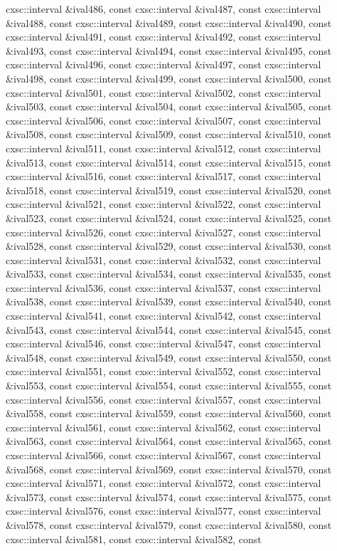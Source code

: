 \begin{DoxyCompactItemize}
cxsc\-::interval \&ival486, const cxsc\-::interval \&ival487, const cxsc\-::interval \&ival488, const cxsc\-::interval \&ival489, const cxsc\-::interval \&ival490, const cxsc\-::interval \&ival491, const cxsc\-::interval \&ival492, const cxsc\-::interval \&ival493, const cxsc\-::interval \&ival494, const cxsc\-::interval \&ival495, const cxsc\-::interval \&ival496, const cxsc\-::interval \&ival497, const cxsc\-::interval \&ival498, const cxsc\-::interval \&ival499, const cxsc\-::interval \&ival500, const cxsc\-::interval \&ival501, const cxsc\-::interval \&ival502, const cxsc\-::interval \&ival503, const cxsc\-::interval \&ival504, const cxsc\-::interval \&ival505, const cxsc\-::interval \&ival506, const cxsc\-::interval \&ival507, const cxsc\-::interval \&ival508, const cxsc\-::interval \&ival509, const cxsc\-::interval \&ival510, const cxsc\-::interval \&ival511, const cxsc\-::interval \&ival512, const cxsc\-::interval \&ival513, const cxsc\-::interval \&ival514, const cxsc\-::interval \&ival515, const cxsc\-::interval \&ival516, const cxsc\-::interval \&ival517, const cxsc\-::interval \&ival518, const cxsc\-::interval \&ival519, const cxsc\-::interval \&ival520, const cxsc\-::interval \&ival521, const cxsc\-::interval \&ival522, const cxsc\-::interval \&ival523, const cxsc\-::interval \&ival524, const cxsc\-::interval \&ival525, const cxsc\-::interval \&ival526, const cxsc\-::interval \&ival527, const cxsc\-::interval \&ival528, const cxsc\-::interval \&ival529, const cxsc\-::interval \&ival530, const cxsc\-::interval \&ival531, const cxsc\-::interval \&ival532, const cxsc\-::interval \&ival533, const cxsc\-::interval \&ival534, const cxsc\-::interval \&ival535, const cxsc\-::interval \&ival536, const cxsc\-::interval \&ival537, const cxsc\-::interval \&ival538, const cxsc\-::interval \&ival539, const cxsc\-::interval \&ival540, const cxsc\-::interval \&ival541, const cxsc\-::interval \&ival542, const cxsc\-::interval \&ival543, const cxsc\-::interval \&ival544, const cxsc\-::interval \&ival545, const cxsc\-::interval \&ival546, const cxsc\-::interval \&ival547, const cxsc\-::interval \&ival548, const cxsc\-::interval \&ival549, const cxsc\-::interval \&ival550, const cxsc\-::interval \&ival551, const cxsc\-::interval \&ival552, const cxsc\-::interval \&ival553, const cxsc\-::interval \&ival554, const cxsc\-::interval \&ival555, const cxsc\-::interval \&ival556, const cxsc\-::interval \&ival557, const cxsc\-::interval \&ival558, const cxsc\-::interval \&ival559, const cxsc\-::interval \&ival560, const cxsc\-::interval \&ival561, const cxsc\-::interval \&ival562, const cxsc\-::interval \&ival563, const cxsc\-::interval \&ival564, const cxsc\-::interval \&ival565, const cxsc\-::interval \&ival566, const cxsc\-::interval \&ival567, const cxsc\-::interval \&ival568, const cxsc\-::interval \&ival569, const cxsc\-::interval \&ival570, const cxsc\-::interval \&ival571, const cxsc\-::interval \&ival572, const cxsc\-::interval \&ival573, const cxsc\-::interval \&ival574, const cxsc\-::interval \&ival575, const cxsc\-::interval \&ival576, const cxsc\-::interval \&ival577, const cxsc\-::interval \&ival578, const cxsc\-::interval \&ival579, const cxsc\-::interval \&ival580, const cxsc\-::interval \&ival581, const cxsc\-::interval \&ival582, const 
\end{DoxyCompactItemize}
